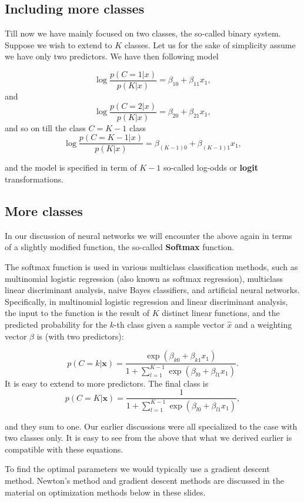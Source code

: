 \documentclass[%
oneside,                 %
final,                   %
10pt]{article}
\begin{document}
\subsection{Including more classes}

Till now we have mainly focused on two classes, the so-called binary
system. Suppose we wish to extend to $K$ classes.  Let us for the sake
of simplicity assume we have only two predictors. We have then following model

\[
\log{\frac{p(C=1\vert x)}{p(K\vert x)}} = \beta_{10}+\beta_{11}x_1,
\]
and 
\[
\log{\frac{p(C=2\vert x)}{p(K\vert x)}} = \beta_{20}+\beta_{21}x_1,
\]
and so on till the class $C=K-1$ class
\[
\log{\frac{p(C=K-1\vert x)}{p(K\vert x)}} = \beta_{(K-1)0}+\beta_{(K-1)1}x_1,
\]

and the model is specified in term of $K-1$ so-called log-odds or
\textbf{logit} transformations.


\subsection{More classes}

In our discussion of neural networks we will encounter the above again
in terms of a slightly modified function, the so-called \textbf{Softmax} function.

The softmax function is used in various multiclass classification
methods, such as multinomial logistic regression (also known as
softmax regression), multiclass linear discriminant analysis, naive
Bayes classifiers, and artificial neural networks.  Specifically, in
multinomial logistic regression and linear discriminant analysis, the
input to the function is the result of $K$ distinct linear functions,
and the predicted probability for the $k$-th class given a sample
vector $\hat{x}$ and a weighting vector $\hat{\beta}$ is (with two
predictors):

\[
p(C=k\vert \mathbf {x} )=\frac{\exp{(\beta_{k0}+\beta_{k1}x_1)}}{1+\sum_{l=1}^{K-1}\exp{(\beta_{l0}+\beta_{l1}x_1)}}.
\]
It is easy to extend to more predictors. The final class is 
\[
p(C=K\vert \mathbf {x} )=\frac{1}{1+\sum_{l=1}^{K-1}\exp{(\beta_{l0}+\beta_{l1}x_1)}},
\]

and they sum to one. Our earlier discussions were all specialized to
the case with two classes only. It is easy to see from the above that
what we derived earlier is compatible with these equations.

To find the optimal parameters we would typically use a gradient
descent method.  Newton's method and gradient descent methods are
discussed in the material on optimization
methods below in these slides.
\end{document}
